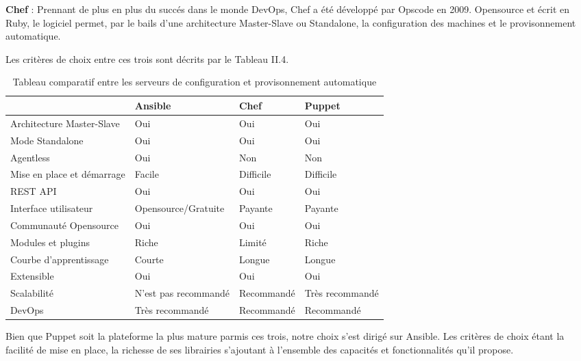 \begin{spacing}{1.2}
\textbf{Chef} : Prennant de plus en plus du succés dans le monde DevOps, Chef a été développé par Opscode en 2009. Opensource et écrit en Ruby, le logiciel permet, par le bails d'une architecture Master-Slave ou Standalone, la configuration des machines et le provisonnement automatique.

Les critères de choix entre ces trois sont décrits par le Tableau II.4. 

\begin{table}[ht]
	\centering
	\caption{Tableau comparatif entre les serveurs de configuration et provisonnement automatique}
	\footnotesize
	\begin{tabularx}{\textwidth}{|p{4cm}|X|X|X|}
          \hline & {\textbf{Ansible}} & {\textbf{Chef}} & {\textbf{Puppet}} \\
          \hline
          Architecture Master-Slave & Oui & Oui & Oui \\
          \hline
          Mode Standalone & Oui & Oui & Oui \\
          \hline
          Agentless & Oui & Non & Non
          \\ 
          \hline
          Mise en place et démarrage & Facile & Difficile & Difficile \\
          \hline
          REST API & Oui & Oui & Oui \\
          \hline
          Interface utilisateur & Opensource/Gratuite & Payante & Payante \\
          \hline
          Communauté Opensource & Oui & Oui & Oui \\
          \hline
          Modules et plugins & Riche & Limité & 
          Riche \\
          \hline
          Courbe d'apprentissage & Courte & Longue & Longue \\
          \hline
          Extensible & Oui & Oui & Oui \\
          \hline
          Scalabilité & N'est pas recommandé & Recommandé & Très recommandé \\
          \hline
          DevOps & Très recommandé & Recommandé & Recommandé \\
          \hline
        \end{tabularx}
	\label{tab:exple}
\end{table}
\FloatBarrier
Bien que Puppet soit la plateforme la plus mature parmis ces trois, notre choix s'est dirigé sur Ansible. Les critères de choix étant la facilité de mise en place, la richesse de ses librairies s'ajoutant à l'ensemble des capacités et fonctionnalités qu’il propose. 


\end{spacing}
